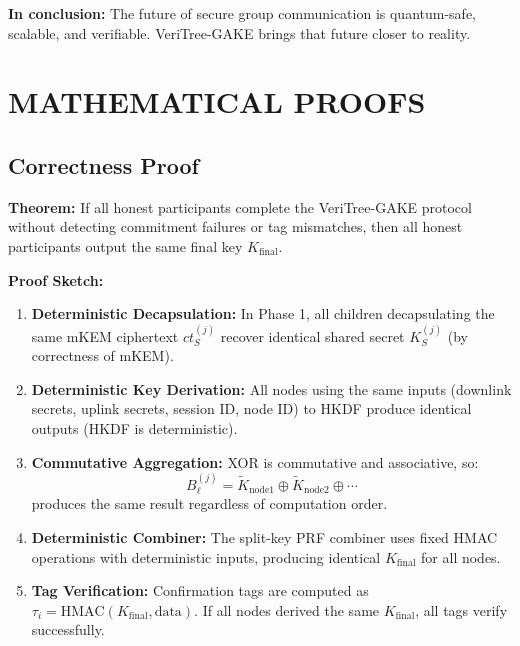\documentclass[12pt,a4paper]{report}
\begin{document}
\textbf{In conclusion:} The future of secure group communication is quantum-safe, scalable, and verifiable. VeriTree-GAKE brings that future closer to reality.


\appendix

\chapter{MATHEMATICAL PROOFS}

\section{Correctness Proof}

\textbf{Theorem:} If all honest participants complete the VeriTree-GAKE protocol without detecting commitment failures or tag mismatches, then all honest participants output the same final key $K_{\text{final}}$.

\textbf{Proof Sketch:}

\begin{enumerate}
\item \textbf{Deterministic Decapsulation:} In Phase 1, all children decapsulating the same mKEM ciphertext $ct_S^{(j)}$ recover identical shared secret $K_S^{(j)}$ (by correctness of mKEM).

\item \textbf{Deterministic Key Derivation:} All nodes using the same inputs (downlink secrets, uplink secrets, session ID, node ID) to HKDF produce identical outputs (HKDF is deterministic).

\item \textbf{Commutative Aggregation:} XOR is commutative and associative, so:
\[
B_\ell^{(j)} = \widetilde{K}_{\text{node1}} \oplus \widetilde{K}_{\text{node2}} \oplus \cdots
\]
produces the same result regardless of computation order.

\item \textbf{Deterministic Combiner:} The split-key PRF combiner uses fixed HMAC operations with deterministic inputs, producing identical $K_{\text{final}}$ for all nodes.

\item \textbf{Tag Verification:} Confirmation tags are computed as $\tau_i = \text{HMAC}(K_{\text{final}}, \text{data})$. If all nodes derived the same $K_{\text{final}}$, all tags verify successfully.
\end{enumerate}
\end{document}
